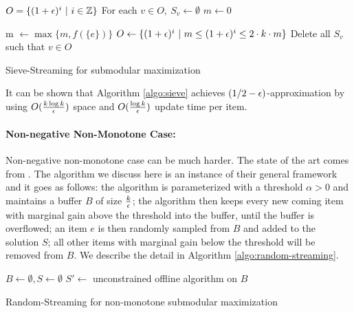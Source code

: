 \begin{algorithm}[H]
\DontPrintSemicolon %
$O = \{(1 + \epsilon)^i~|~i\in \mathbb{Z}\}$\;
\;
For each $v\in O, ~S_v \gets \emptyset$\;
$m \gets 0$\;

 {
  m $\gets \max\{m, f(\{e\})\}$\;
  $O\gets \{(1 + \epsilon)^i~|~m \leq (1 + \epsilon)^i \leq 2\cdot k \cdot m\}$\;
  Delete all $S_v$ such that $v \in O$\;
}
\;
\caption{{\sc Sieve-Streaming} for submodular maximization}
\label{algo:sieve}
\end{algorithm}

It can be shown that Algorithm \ref{algo:sieve} achieves $(1/2-\epsilon)$-approximation by using $O(\frac{k \log k}{\epsilon})$ space and $O(\frac{\log k}{\epsilon})$ update time per item.


\paragraph{Non-negative Non-Monotone Case:} Non-negative non-monotone case can be much harder. The state of the art comes from \cite{CGQ15}. The algorithm we discuss here is an instance of their general framework and it goes as follows: the algorithm is parameterized with a threshold $\alpha > 0$ and  maintains a buffer $B$ of size $\frac{k}{\epsilon}$; the algorithm then keeps every new coming item with marginal gain above the threshold into the buffer, until the buffer is overflowed; an item $e$ is then randomly sampled from $B$ and added to the solution $S$; all other items with marginal gain below the threshold will be removed from $B$.   We describe the detail in Algorithm \ref{algo:random-streaming}.

\begin{algorithm}[H]
\DontPrintSemicolon %
$B\gets \emptyset, S\gets \emptyset$\;
 {
}
$S' \gets$ unconstrained offline algorithm on $B$\;
\;
\caption{{\sc Random-Streaming} for non-monotone submodular maximization}
\label{algo:random-streaming}
\end{algorithm}

